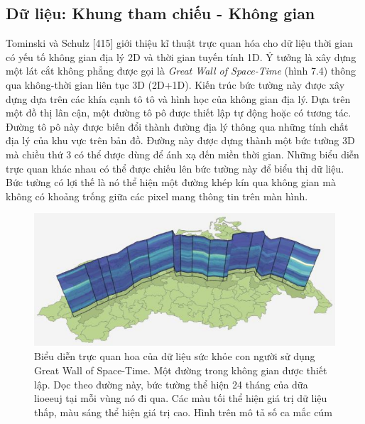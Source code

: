\subsection{Dữ liệu: Khung tham chiếu - Không gian}
Tominski và Schulz [415] giới thiệu kĩ thuật trực quan hóa cho dữ liệu thời gian có yếu tố không gian địa lý 2D và thời gian tuyến tính 1D. Ý tưởng là xây dựng một lát cắt không phẳng được gọi là \textit{Great Wall of Space-Time} (hình 7.4) thông qua không-thời gian liên tục 3D (2D+1D). Kiến trúc bức tường này được xây dựng dựa trên các khía cạnh tô tô và hình học của không gian địa lý. Dựa trên một đồ thị lân cận, một đường tô pô được thiết lập tự động hoặc có tương tác. Đường tô pô này được biến đổi thành đường địa lý thông qua những tính chất địa lý của khu vực trên bản đồ. Đường này được dựng thành một bức tường 3D mà chiều thứ 3 có thể được dùng để ánh xạ đến miền thời gian. Những biểu diễn trực quan khác nhau có thể được chiếu lên bức tường này để biểu thị dữ liệu. Bức tường có lợi thế là nó thể hiện một đường khép kín qua không gian mà không có khoảng trống giữa các pixel mang thông tin trên màn hình. 
\begin{figure}[H] %
    \centering %
    \includegraphics[width=1\textwidth]{assets/fig_7_4.png} 
    \caption{Biểu diễn trực quan hoa của dữ liệu sức khỏe con người sử dụng Great Wall of Space-Time. Một đường trong không gian được thiết lập. Dọc theo đường này, bức tường thể hiện 24 tháng của dữa lioeeuj tại mỗi vùng nó đi qua. Các màu tối thể hiện giá trị dữ liệu thấp, màu sáng thể hiện giá trị cao. Hình trên mô tả số ca mắc cúm } %
    \label{fig:f7.3}
\end{figure}